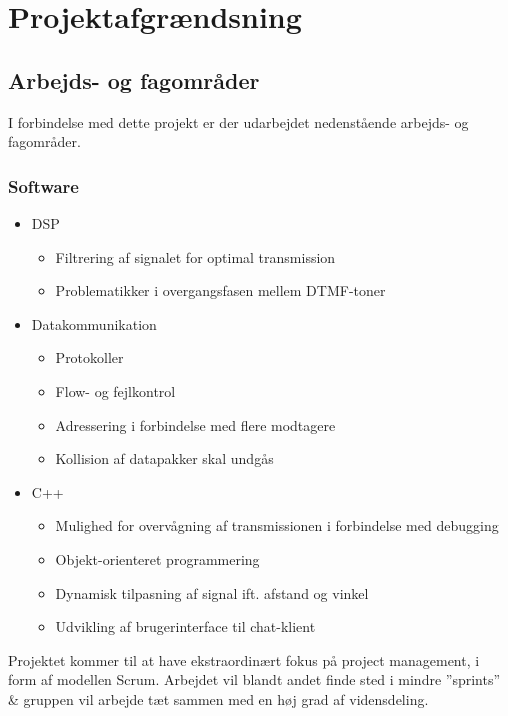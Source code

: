 \section{Projektafgrændsning}


\subsection{Arbejds- og fagområder}

I forbindelse med dette projekt er der udarbejdet nedenstående arbejds- og fagområder.

\subsubsection{Software}

\begin{itemize}[noitemsep]
  \item DSP
  \begin{itemize}[noitemsep]
    \item Filtrering af signalet for optimal transmission
    \item Problematikker i overgangsfasen mellem DTMF-toner
  \end{itemize}
  \item Datakommunikation
  \begin{itemize}[noitemsep]
    \item Protokoller
    \item Flow- og fejlkontrol
    \item Adressering i forbindelse med flere modtagere
    \item Kollision af datapakker skal undgås
  \end{itemize}
  \item C++
    \begin{itemize}[noitemsep]
    \item Mulighed for overvågning af transmissionen i forbindelse med debugging
    \item Objekt-orienteret programmering
    \item Dynamisk tilpasning af signal ift. afstand og vinkel
    \item Udvikling af brugerinterface til chat-klient
  \end{itemize}
\end{itemize}

Projektet kommer til at have ekstraordinært fokus på project management, i form af modellen Scrum. Arbejdet vil blandt andet finde sted i mindre ”sprints” \& gruppen vil arbejde tæt sammen med en høj grad af vidensdeling.

